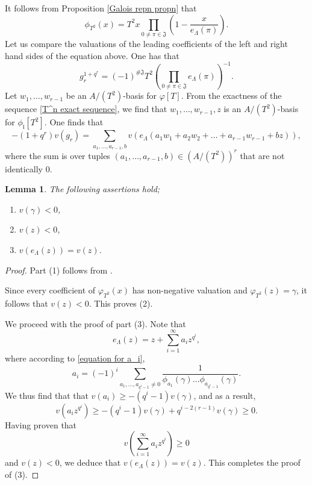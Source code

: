 \documentclass[11pt]{amsart}
\newtheorem{lemma}[theorem]{Lemma}
\newcommand{\fl}{\mathfrak{l}}
\numberwithin{equation}{section}
\begin{document}
\par It follows from Proposition \ref{Galois repn propn} that 
\[\phi_{T^2}(x)=T^2 x\prod_{0\neq \pi\in \mathfrak{J}} \left(1-\frac{x}{e_\Lambda(\pi)}\right).\]
Let us compare the valuations of the leading coefficients of the left and right hand sides of the equation above. One has that
\[g_r^{1+q^r}=(-1)^{\# \mathfrak{J}} T^2 \left(\prod_{0\neq \pi\in \mathfrak{J}} e_{\Lambda}(\pi)\right)^{-1}.\]
Let $w_1, \dots, w_{r-1}$ be an $A/(T^2)$-basis for $\varphi[T]$. From the exactness of the sequence \eqref{T^n exact sequence}, we find that $w_1, \dots, w_{r-1}, z$ is an $A/(T^2)$-basis for $\phi_{\fl}[T^2]$. One finds that 
\begin{equation}\label{long equation}-(1+q^r)v(g_r)=\sum_{a_1, \dots, a_{r-1}, b}v\left(e_\Lambda(a_1 w_1+a_2 w_2+\dots+a_{r-1} w_{r-1} +b z)\right),\end{equation} where the sum is over tuples $(a_1, \dots, a_{r-1}, b)\in (A/(T^2))^r$ that are not identically $0$.
\begin{lemma}
    The following assertions hold;
    \begin{enumerate}
        \item $v(\gamma)<0$, 
        \item $v(z)<0$, 
        \item $v(e_\Lambda(z))=v(z)$.
    \end{enumerate}
\end{lemma}
\begin{proof}
    \par Part (1) follows from \cite[Example 6.2.2 p.353]{papibook}. 
    
    \par Since every coefficient of $\varphi_{T^2}(x)$ has non-negative valuation and $\varphi_{T^2}(z)=\gamma$, it follows that $v(z)<0$. This proves (2). 
    
    \par We proceed with the proof of part (3). Note that 
    \[e_{\Lambda}(z)=z+\sum_{i=1}^\infty a_i z^{q^i},\] where according to \eqref{equation for a_i}, 
    \[a_i=(-1)^i\sum_{a_1, \dots, a_{q^i-1}\neq 0} \frac{1}{\phi_{a_1}(\gamma)\dots \phi_{a_{q^i-1}}(\gamma)}.\]
    We thus find that that $v(a_i)\geq -(q^i-1) v(\gamma)$, and as a result,
    \[v(a_i z^{q^i})\geq -(q^i-1)v(\gamma)+q^{i-2(r-1)}v(\gamma)\geq 0. \]
    Having proven that \[v\left(\sum_{i=1}^\infty a_i z^{q^i}\right)\geq 0\] and $v(z)<0$, we deduce that $v(e_\Lambda(z))=v(z)$. This completes the proof of (3).
\end{proof}
\end{document}
